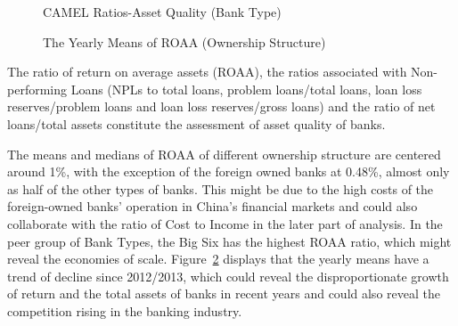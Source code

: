 \documentclass[
  12pt,
  a4paper,
]{scrreprt}
\begin{document}
{{{{\begin{figure}
{}

\caption{\label{fig-CAMELAQ1}CAMEL Ratios-Asset Quality (Bank Type)}

\end{figure}%

\begin{figure}


\caption{\label{fig-ROAA}The Yearly Means of ROAA (Ownership Structure)}

\end{figure}%

The ratio of return on average assets (ROAA), the ratios associated with
Non-performing Loans (NPLs to total loans, problem loans/total loans,
loan loss reserves/problem loans and loan loss reserves/gross loans) and
the ratio of net loans/total assets constitute the assessment of asset
quality of banks.

The means and medians of ROAA of different ownership structure are
centered around 1\%, with the exception of the foreign owned banks at
0.48\%, almost only as half of the other types of banks. This might be
due to the high costs of the foreign-owned banks' operation in China's
financial markets and could also collaborate with the ratio of Cost to
Income in the later part of analysis. In the peer group of Bank Types,
the Big Six has the highest ROAA ratio, which might reveal the economies
of scale. Figure~\ref{fig-ROAA} displays that the yearly means have a
trend of decline since 2012/2013, which could reveal the
disproportionate growth of return and the total assets of banks in
recent years and could also reveal the competition rising in the banking
industry.

}}}}
\end{document}
